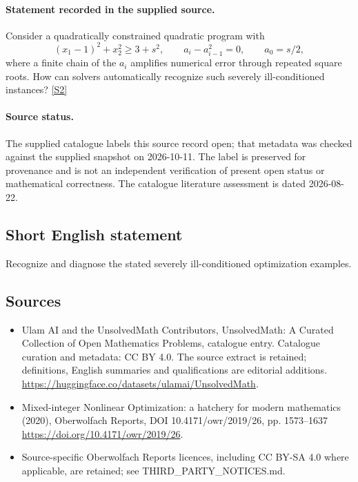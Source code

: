 \documentclass[11pt]{article}
\begin{document}
\paragraph{Statement recorded in the supplied source.}
Consider a quadratically constrained quadratic program with $$ (x_1-1)^2+x_2^2\geq3+s^2,\qquad a_i-a_{i-1}^2=0,\qquad a_0=s/2,$$ where a finite chain of the $a_i$ amplifies numerical error through repeated square roots. How can solvers automatically recognize such severely ill-conditioned instances? \href{https://doi.org/10.4171/owr/2019/26}{[S2]}
\paragraph{Source status.}
The supplied catalogue labels this source record open; that metadata was checked against the supplied snapshot on 2026-10-11. The label is preserved for provenance and is not an independent verification of present open status or mathematical correctness. The catalogue literature assessment is dated 2026-08-22.
\subsection{Short English statement}
Recognize and diagnose the stated severely ill-conditioned optimization examples.
\subsection{Sources}
\begin{itemize}
\item[S1] Ulam AI and the UnsolvedMath Contributors, UnsolvedMath: A Curated Collection of Open Mathematics Problems, catalogue entry. Catalogue curation and metadata: CC BY 4.0. The source extract is retained; definitions, English summaries and qualifications are editorial additions.
\url{https://huggingface.co/datasets/ulamai/UnsolvedMath}.
\item[S2] Mixed-integer Nonlinear Optimization: a hatchery for modern mathematics (2020), Oberwolfach Reports, DOI 10.4171/owr/2019/26, pp. 1573--1637
\url{https://doi.org/10.4171/owr/2019/26}.
\item Source-specific Oberwolfach Reports licences, including CC BY-SA 4.0 where applicable, are retained; see THIRD\_PARTY\_NOTICES.md.
\end{itemize}
\end{document}
